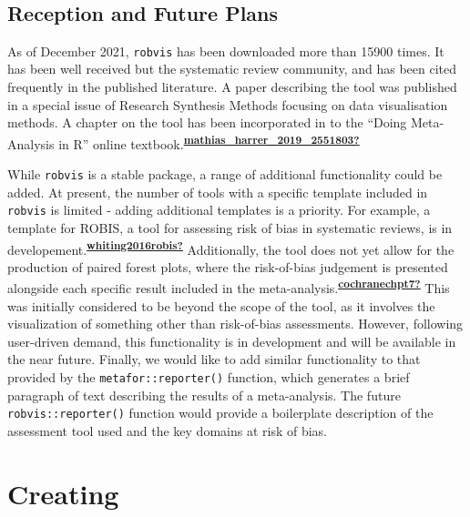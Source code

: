 \documentclass[a4paper, twoside]{templates/ociamthesis}
\begin{document}
~

\hypertarget{reception-and-future-plans-1}{%
\subsection{Reception and Future Plans}\label{reception-and-future-plans-1}}

As of December 2021, \texttt{robvis} has been downloaded more than 15900 times. It has been well received but the systematic review community, and has been cited frequently in the published literature. A paper describing the tool was published in a special issue of Research Synthesis Methods focusing on data visualisation methods. A chapter on the tool has been incorporated in to the ``Doing Meta-Analysis in R'' online textbook.\textsuperscript{\protect\hyperlink{ref-mathias_harrer_2019_2551803}{\textbf{mathias\_harrer\_2019\_2551803?}}}

While \texttt{robvis} is a stable package, a range of additional functionality could be added. At present, the number of tools with a specific template included in \texttt{robvis} is limited - adding additional templates is a priority. For example, a template for ROBIS, a tool for assessing risk of bias in systematic reviews, is in developement.\textsuperscript{\protect\hyperlink{ref-whiting2016robis}{\textbf{whiting2016robis?}}} Additionally, the tool does not yet allow for the production of paired forest plots, where the risk-of-bias judgement is presented alongside each specific result included in the meta-analysis.\textsuperscript{\protect\hyperlink{ref-cochranechpt7}{\textbf{cochranechpt7?}}} This was initially considered to be beyond the scope of the tool, as it involves the visualization of something other than risk-of-bias assessments. However, following user-driven demand, this functionality is in development and will be available in the near future. Finally, we would like to add similar functionality to that provided by the \texttt{metafor::reporter()} function, which generates a brief paragraph of text describing the results of a meta-analysis. The future \texttt{robvis::reporter()} function would provide a boilerplate description of the assessment tool used and the key domains at risk of bias.

\hypertarget{creating}{%
\section{Creating}\label{creating}}

\newpage
\end{document}
